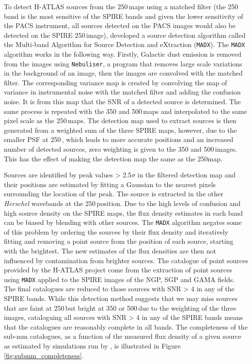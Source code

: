 To detect H-ATLAS sources from the 250\,\micron maps using a matched filter (the 250\,\micron band is the most sensitive of the SPIRE bands and given the lower sensitivity of the PACS instrument, all sources detected on the PACS images would also be detected on the SPIRE 250\,\micron image), \citealt{Maddox_2020} developed a source detection algorithm called the Multi-band Algorithm for Source Detection and eXtraction (\texttt{MADX}). The \texttt{MADX} algorithm works in the following way. Firstly, Galactic dust emission is removed from the images using \texttt{Nebuliser}, a program that removes large scale variations in the background of an image, then the images are convolved with the matched filter. The corresponding variance map is created by convolving the map of variance in instrumental noise with the matched filter and adding the confusion noise. It is from this map that the SNR of a detected source is determined. The same process is repeated with the 350 and 500\,\micron maps and interpolated to the same pixel scale as the 250\,\micron maps. The detection map used to extract sources is then generated from a weighted sum of the three SPIRE maps, however, due to the smaller PSF at 250\,\micron, which leads to more accurate positions and an increased number of detected sources, zero weighting is given to the 350 and 500\,\micron images. This has the effect of making the detection map the same as the 250\micron map.

Sources are identified by peak values > 2.5$\sigma$ in the filtered detection map and their positions are estimated by fitting a Gaussian to the nearest pixels surrounding the location of the peak. The source is extracted in the other \textit{Herschel} wavebands at the 250\,\micron position. Due to the high levels of confusion and high source density on the SPIRE maps, the flux density estimates in each band can be biased by blending with other sources. The \texttt{MADX} algorithm negates some of this problem by ordering the sources by their flux density and iteratively fitting and removing a point source from the position of each source, starting with the brightest. The new estimates of the flux densities are then not influenced by contamination from brighter sources. The catalogue of point sources provided by the H-ATLAS project come from the extraction of point sources using \texttt{MADX} applied to the SPIRE images of the NGP, SGP and GAMA fields. The final catalogues are reduced to those sources with SNR > 4 in any of the SPIRE bands. While this detection method suggests that we may miss sources that are faint at 250\,\micron but bright at 350 or 500\,\micron due to the weighting of the three images, cataloguing all sources with SNR > 4 in any of the SPIRE bands means that the catalogues are reasonably complete in all bands. The completeness of the sub-mm catalogues, as a function of the measured flux density of a given source as estimated by simulations run by \citealt{Valiante_2016}, is illustrated in Figure \ref{fig:submm_completeness}.

